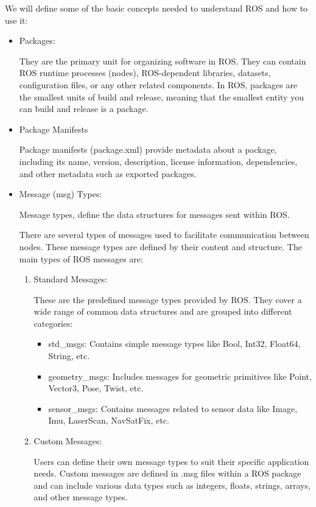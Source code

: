 We will define some of the basic concepts needed to understand ROS and how to use it:
\begin{itemize}
	\item Packages: 
	
	They are the primary unit for organizing software in ROS. They can contain ROS runtime processes (nodes), ROS-dependent libraries, datasets, configuration files, or any other related components. In ROS, packages are the smallest units of build and release, meaning that the smallest entity you can build and release is a package.
	\item Package Manifests
	
	Package manifests (package.xml) provide metadata about a package, including its name, version, description, license information, dependencies, and other metadata such as exported packages.
	
	\item Message (msg) Types:
	
	Message types, define the data structures for messages sent within ROS.

	There are several types of messages used to facilitate communication between nodes. These message types are defined by their content and structure. The main types of ROS messages are:
		\newpage
	\begin{enumerate}
		\item Standard Messages:
		
		These are the predefined message types provided by ROS. They cover a wide range of common data structures and are grouped into different categories:
		
		\begin{itemize}
			\item std\_msgs: 
			Contains simple message types like Bool, Int32, Float64, String, etc.
			\item geometry\_msgs:
			Includes messages for geometric primitives like Point, Vector3, Pose, Twist, etc.
			\item sensor\_msgs:
			Contains messages related to sensor data like Image, Imu, LaserScan, NavSatFix, etc.
		\end{itemize}
		\item Custom Messages:
		
		Users can define their own message types to suit their specific application needs. Custom messages are defined in .msg files within a ROS package and can include various data types such as integers, floats, strings, arrays, and other message types.
	\end{enumerate}  
	  

\end{itemize}
